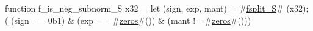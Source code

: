 function f_is_neg_subnorm_S   x32 = {
  let (sign, exp, mant) = #\hyperref[sailRISCVzfsplitzyS]{fsplit\_S}# (x32);
  (  (sign == 0b1)
   & (exp  == #\hyperref[sailRISCVzzzeros]{zeros}#())
   & (mant != #\hyperref[sailRISCVzzzeros]{zeros}#()))
}
